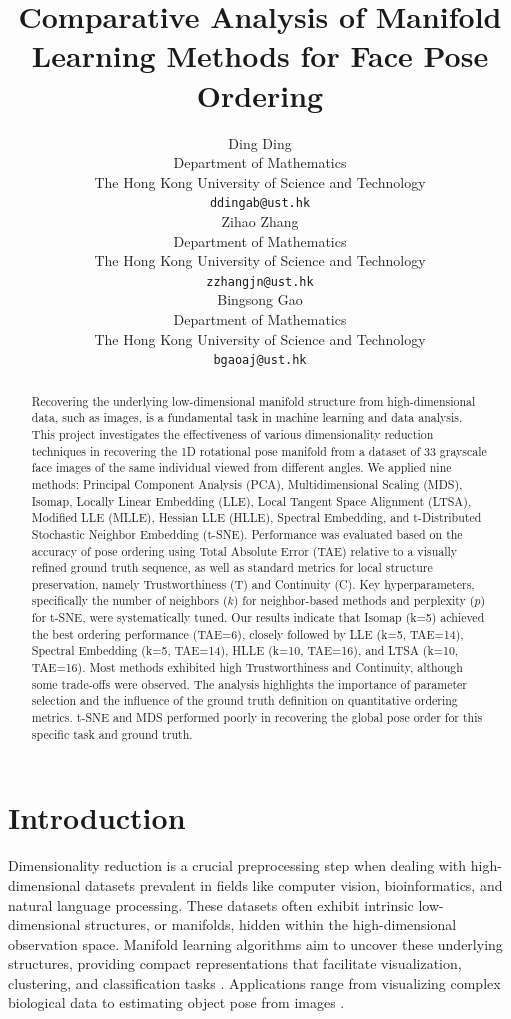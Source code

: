\documentclass{article}
\title{Comparative Analysis of Manifold Learning Methods for Face Pose Ordering}
\author{%
  Ding Ding \\
  Department of Mathematics\\
  The Hong Kong University of Science and Technology\\
  \texttt{ddingab@ust.hk} \\
  \And
  Zihao Zhang \\
  Department of Mathematics\\
  The Hong Kong University of Science and Technology\\
  \texttt{zzhangjn@ust.hk} \\
  \And
  Bingsong Gao \\
  Department of Mathematics\\
  The Hong Kong University of Science and Technology\\
  \texttt{bgaoaj@ust.hk} \\
}
\begin{document}
\maketitle

\begin{abstract}
  Recovering the underlying low-dimensional manifold structure from high-dimensional data, such as images, is a fundamental task in machine learning and data analysis. This project investigates the effectiveness of various dimensionality reduction techniques in recovering the 1D rotational pose manifold from a dataset of 33 grayscale face images of the same individual viewed from different angles. We applied nine methods: Principal Component Analysis (PCA), Multidimensional Scaling (MDS), Isomap, Locally Linear Embedding (LLE), Local Tangent Space Alignment (LTSA), Modified LLE (MLLE), Hessian LLE (HLLE), Spectral Embedding, and t-Distributed Stochastic Neighbor Embedding (t-SNE). Performance was evaluated based on the accuracy of pose ordering using Total Absolute Error (TAE) relative to a visually refined ground truth sequence, as well as standard metrics for local structure preservation, namely Trustworthiness (T) and Continuity (C). Key hyperparameters, specifically the number of neighbors ($k$) for neighbor-based methods and perplexity ($p$) for t-SNE, were systematically tuned. Our results indicate that Isomap (k=5) achieved the best ordering performance (TAE=6), closely followed by LLE (k=5, TAE=14), Spectral Embedding (k=5, TAE=14), HLLE (k=10, TAE=16), and LTSA (k=10, TAE=16). Most methods exhibited high Trustworthiness and Continuity, although some trade-offs were observed. The analysis highlights the importance of parameter selection and the influence of the ground truth definition on quantitative ordering metrics. t-SNE and MDS performed poorly in recovering the global pose order for this specific task and ground truth.
\end{abstract}

\section{Introduction}
\label{sec:intro}

Dimensionality reduction is a crucial preprocessing step when dealing with high-dimensional datasets prevalent in fields like computer vision, bioinformatics, and natural language processing. These datasets often exhibit intrinsic low-dimensional structures, or manifolds, hidden within the high-dimensional observation space. Manifold learning algorithms aim to uncover these underlying structures, providing compact representations that facilitate visualization, clustering, and classification tasks \citep{vanDerMaaten2009}. Applications range from visualizing complex biological data to estimating object pose from images \citep{Tenenbaum2000, Roweis2000}.
\end{document}
